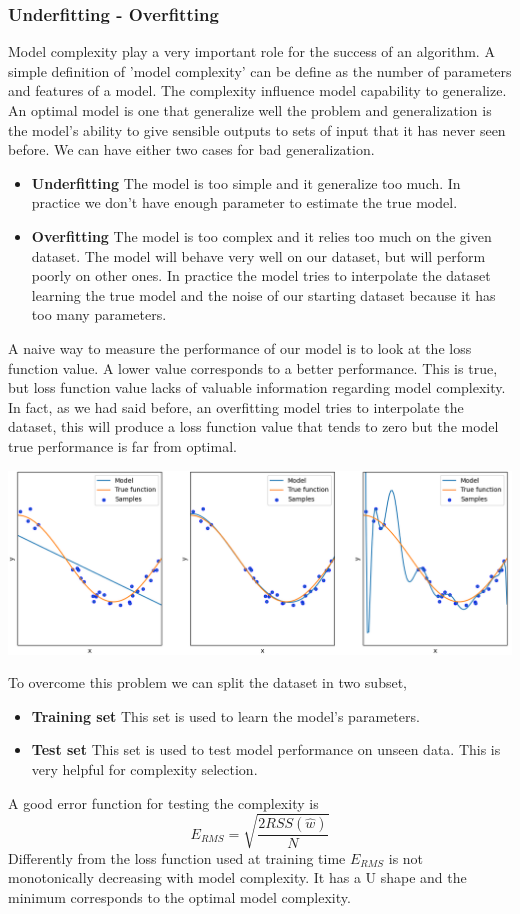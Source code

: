 \documentclass[../main.tex]{subfiles}
\begin{document}
\subsubsection{Underfitting - Overfitting} \label{fitting}
Model complexity play a very important role for the success of an algorithm. A simple definition of 'model complexity' can be define as the number of parameters and features of a model. The complexity influence model capability to generalize.
An optimal model is one that generalize well the problem and generalization is the model’s ability to give sensible outputs to sets of input that it has never seen before. We can have either two cases for bad generalization.
\begin{itemize}
    \item \textbf{Underfitting} The model is too simple and it generalize too much. In practice we don't have enough parameter to estimate the true model.
    \item \textbf{Overfitting} The model is too complex and it relies too much on the given dataset. The model will behave very well on our dataset, but will perform poorly on other ones. In practice the model tries to interpolate the dataset learning the true model and the noise of our starting dataset because it has too many parameters.
\end{itemize}
A naive way to measure the performance of our model is to look at the loss function value. A lower value corresponds to a better performance. This is true, but loss function value lacks of valuable information regarding model complexity. In fact, as we had said before, an overfitting model tries to interpolate the dataset, this will produce a loss function value that tends to zero but the model true performance is far from optimal.
\begin{center}
    \includegraphics[scale=0.5]{images/Under-Overfitting.png}
\end{center}
To overcome this problem we can split the dataset in two subset,
\begin{itemize}
    \item \textbf{Training set} This set is used to learn the model's parameters.
    \item \textbf{Test set} This set is used to test model performance on unseen data. This is very helpful for complexity selection.
\end{itemize}
A good error function for testing the complexity is
\begin{equation}
    E_{RMS}=\sqrt{\frac{2RSS(\hat{w})}{N}}
\end{equation}
Differently from the loss function used at training time $E_{RMS}$ is not monotonically decreasing with model complexity. It has a U shape and the minimum corresponds to the optimal model complexity.
\end{document}

